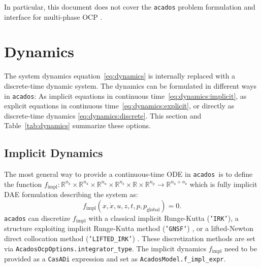 \documentclass[english]{article}
\newcommand{\code}[1]{\texttt{#1}}
\newcommand{\casadi}{\texttt{CasADi}}
\newcommand{\acados}{\texttt{acados}}
\newcommand{\matlab}{\textsc{MATLAB}}
\newcommand{\ind}[1]{_{\textrm{#1}}}
\newcommand{\glob}{_{\textrm{global}}}
\newcommand{\nx}{n\ind{x}}
\newcommand{\nuu}{n\ind{u}}
\newcommand{\nz}{n\ind{z}}
\newcommand{\np}{n\ind{p}}
\begin{document}
In particular, this document does not cover the \acados{} problem formulation and interface for multi-phase OCP \cite{frey2024multi}.




\section{Dynamics}\label{sec:dynamics}
%
%
The system dynamics equation~\eqref{eq:dynamics} is internally replaced with a discrete-time dynamic system.
The dynamics can be formulated in different ways in \acados:
As implicit equations in continuous time~\eqref{eq:dynamics:implicit}, as explicit equations in continuous time~\eqref{eq:dynamics:explicit}, or directly as discrete-time dynamics \eqref{eq:dynamics:discrete}.
This section and Table~\ref{tab:dynamics} summarize these options.
%
\subsection{Implicit Dynamics}\label{sec:dynamics:implicit}
%
The most general way to provide a continuous-time ODE in \acados\ is to define the function $ f\ind{impl}: \mathbb{R}^{\nx}\times\mathbb{R}^{\nx}\times\mathbb{R}^{\nuu}\times\mathbb{R}^{\nz}\times\mathbb{R} \times \mathbb{R}^{\np} \rightarrow \mathbb{R}^{\nx+\nz}$ which is fully implicit DAE formulation describing the system as:
\begin{equation}
    f\ind{impl}(x, \dot{x}, u, z, t, p, p\glob) = 0.\label{eq:dynamics:implicit}
\end{equation}
\acados{} can discretize $ f\ind{impl} $ with a classical implicit Runge-Kutta (\code{'IRK'}), a structure exploiting implicit Runge-Kutta method (\code{'GNSF'}) \cite{Frey2019}, or a lifted-Newton direct collocation method (\code{'LIFTED\_IRK'}) \cite{Quirynen2015a}.
These discretization methods are set via \code{AcadosOcpOptions.integrator\_type}.
The implicit dynamics $f\ind{impl}$ need to be provided as a \casadi{} expression and set as \code{AcadosModel.f\_impl\_expr}.
\end{document}
